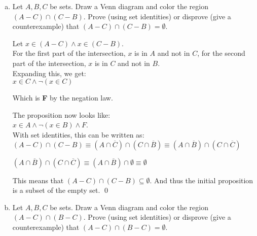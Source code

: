 \documentclass[12pt]{article}
\begin{document}
\begin{enumerate}[a)]
\item Let $A, B, C$ be sets. Draw a Venn diagram and color the region
  $(A - C) \cap (C- B)$.  Prove (using set identities) or disprove
  (give a counterexample) that $(A - C) \cap (C- B) = \emptyset$.


  Let $x \in (A - C) \wedge x \in (C - B)$. \\
  For the first part of the intersection, $x$ is in $A$ and not in $C$, for the second part of the intersection, $x$ is in $C$ and not in $B$. \\

  Expanding this, we get: \\
  $x \in C \wedge \neg (x \in C)$

  Which is \textbf{F} by the negation law. 

  The proposition now looks like: \\
  $x \in A \wedge \neg (x \in B) \wedge F$. \\

  With set identities, this can be written as: \\
  $(A - C) \cap (C - B) \equiv (A \cap \overline{C}) \cap (C \cap \overline{B}) \equiv (A \cap \overline{B}) \cap (C \cap \overline{C})$ 

  $ (A \cap \overline{B}) \cap (C \cap \overline{C}) \equiv (A\cap \overline{B}) \cap \emptyset \equiv \emptyset$

  This means that $(A-C) \cap (C-B) \subseteq \emptyset$.
  And thus the initial proposition is a subset of the empty set.
  \qed
  
  
\medskip

\item Let $A, B, C$ be sets. Draw a Venn diagram and color the region
  $(A - C) \cap (B- C)$. Prove (using set identities) or disprove
  (give a counterexample) that $(A - C) \cap (B- C) = \emptyset$.

\end{enumerate}
\end{document}
